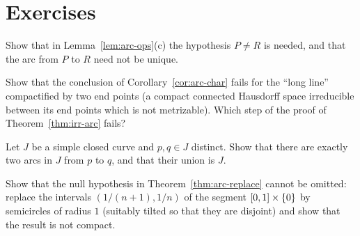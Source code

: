 \section*{Exercises}

\begin{exercise}
Show that in Lemma~\ref{lem:arc-ops}(c) the hypothesis $P\ne R$ is needed, and that the arc from $P$
to $R$ need not be unique.
\end{exercise}

\begin{exercise}
Show that the conclusion of Corollary~\ref{cor:arc-char} fails for the ``long line'' compactified
by two end points (a compact connected Hausdorff space irreducible between its end points which is
not metrizable). Which step of the proof of Theorem~\ref{thm:irr-arc} fails?
\end{exercise}

\begin{exercise}
Let $J$ be a simple closed curve and $p,q\in J$ distinct. Show that there are exactly two arcs in
$J$ from $p$ to $q$, and that their union is $J$.
\end{exercise}

\begin{exercise}
Show that the null hypothesis in Theorem~\ref{thm:arc-replace} cannot be omitted: replace the
intervals $(1/(n+1),1/n)$ of the segment $[0,1]\times\left\{ 0 \right\}$ by semicircles of radius $1$ (suitably
tilted so that they are disjoint) and show that the result is not compact.
\end{exercise}
